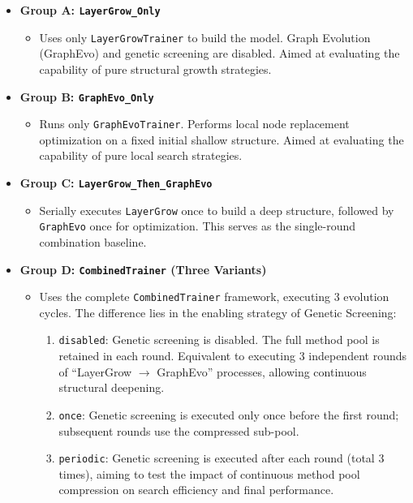 \begin{itemize}
    \item \textbf{Group A: \texttt{LayerGrow\_Only}}
    \begin{itemize}
        \item Uses only \texttt{LayerGrowTrainer} to build the model. Graph Evolution (GraphEvo) and genetic screening are disabled. Aimed at evaluating the capability of pure structural growth strategies.
    \end{itemize}
    
    \item \textbf{Group B: \texttt{GraphEvo\_Only}}
    \begin{itemize}
        \item Runs only \texttt{GraphEvoTrainer}. Performs local node replacement optimization on a fixed initial shallow structure. Aimed at evaluating the capability of pure local search strategies.
    \end{itemize}
    
    \item \textbf{Group C: \texttt{LayerGrow\_Then\_GraphEvo}}
    \begin{itemize}
        \item Serially executes \texttt{LayerGrow} once to build a deep structure, followed by \texttt{GraphEvo} once for optimization. This serves as the single-round combination baseline.
    \end{itemize}
    
    \item \textbf{Group D: \texttt{CombinedTrainer} (Three Variants)}
    \begin{itemize}
        \item Uses the complete \texttt{CombinedTrainer} framework, executing 3 evolution cycles. The difference lies in the enabling strategy of Genetic Screening:
        \begin{enumerate}
            \item \texttt{disabled}: Genetic screening is disabled. The full method pool is retained in each round. Equivalent to executing 3 independent rounds of ``LayerGrow $\rightarrow$ GraphEvo'' processes, allowing continuous structural deepening.
            \item \texttt{once}: Genetic screening is executed only once before the first round; subsequent rounds use the compressed sub-pool.
            \item \texttt{periodic}: Genetic screening is executed after each round (total 3 times), aiming to test the impact of continuous method pool compression on search efficiency and final performance.
        \end{enumerate}
    \end{itemize}
\end{itemize}

